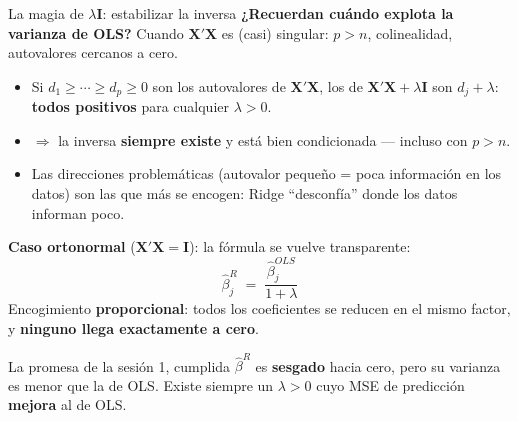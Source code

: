 \documentclass{beamer}
\newcommand{\1}{\mathbb{I}}
\begin{document}
\begin{frame}{La magia de $\lambda\mathbf{I}$: estabilizar la inversa}
\small
\textbf{¿Recuerdan cuándo explota la varianza de OLS?} Cuando $\mathbf{X}'\mathbf{X}$ es (casi) singular: $p > n$, colinealidad, autovalores cercanos a cero.
\pause

\vspace{0.2cm}
\begin{itemize}\itemsep5pt
  \item Si $d_1 \geq \cdots \geq d_p \geq 0$ son los autovalores de $\mathbf{X}'\mathbf{X}$, los de $\mathbf{X}'\mathbf{X} + \lambda\mathbf{I}$ son $d_j + \lambda$: \textbf{todos positivos} para cualquier $\lambda > 0$.
  \item $\Rightarrow$ la inversa \textbf{siempre existe} y está bien condicionada --- incluso con $p > n$.
  \item Las direcciones problemáticas (autovalor pequeño = poca información en los datos) son las que más se encogen: Ridge ``desconfía'' donde los datos informan poco. \pause
\end{itemize}

\vspace{0.1cm}
\textbf{Caso ortonormal} ($\mathbf{X}'\mathbf{X} = \mathbf{I}$): la fórmula se vuelve transparente:
\[ \hat{\beta}^{R}_j \;=\; \frac{\hat{\beta}^{OLS}_j}{1 + \lambda} \]
Encogimiento \textbf{proporcional}: todos los coeficientes se reducen en el mismo factor, y \textbf{ninguno llega exactamente a cero}.
\pause

\begin{block}{La promesa de la sesión 1, cumplida}
$\hat{\beta}^{R}$ es \textbf{sesgado} hacia cero, pero su varianza es menor que la de OLS. Existe siempre un $\lambda > 0$ cuyo MSE de predicción \textbf{mejora} al de OLS.
\end{block}
\end{frame}
\end{document}
